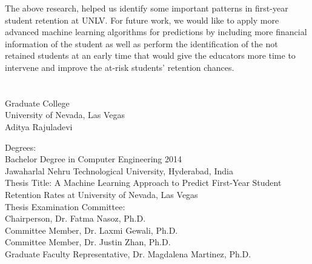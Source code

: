 \documentclass[11pt,openright]{report}
\begin{document}
The above research, helped us identify some important patterns in first-year student retention at UNLV. For future work, we would like to apply more advanced machine learning algorithms for predictions by including more financial information of the student as well as perform the identification of the not retained students at an early time that would give the educators more time to intervene and improve the at-risk students' retention chances.





\vita
\chapter{} %
\linespread{1.3} 
\begin{center}
Graduate College\\
University of Nevada, Las Vegas\\[1cm]
Aditya Rajuladevi\\[1cm]
\end{center}

\noindent Degrees:\\
\indent Bachelor Degree in Computer Engineering 2014\\
\indent Jawaharlal Nehru Technological University, Hyderabad, India\\

\noindent Thesis Title: A Machine Learning Approach to Predict First-Year Student Retention Rates at University of Nevada, Las Vegas\\

\noindent Thesis Examination Committee:\\
\indent Chairperson, Dr. Fatma Nasoz, Ph.D.\\
\indent Committee Member, Dr. Laxmi Gewali, Ph.D.\\
\indent Committee Member, Dr. Justin Zhan, Ph.D.\\
\indent Graduate Faculty Representative, Dr. Magdalena Martinez, Ph.D.\\
\end{document}
